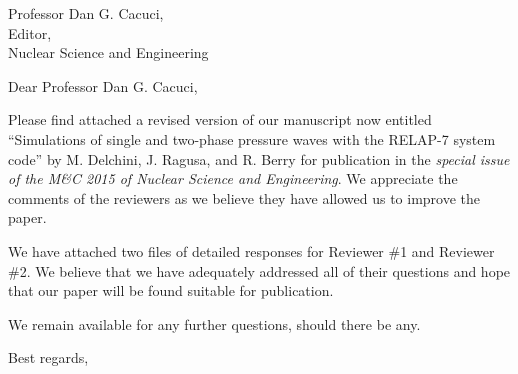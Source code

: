 \begin{letter}{Professor Dan G. Cacuci,\\
    Editor,\\
    Nuclear Science and Engineering}
\date{\today}

\opening{Dear Professor Dan G. Cacuci,}
         \vspace{0.25cm}

Please find attached  a revised version of our manuscript now entitled
``Simulations of single and two-phase pressure waves with the RELAP-7 system code''
by M. Delchini, J. Ragusa, and R. Berry for
publication in the {\em special issue of the M\&C 2015 of Nuclear Science and Engineering}. We appreciate the comments of the reviewers as we
believe they have allowed us to improve the paper.

We have attached two files of detailed responses for Reviewer \#1 and Reviewer \#2. We believe that we have adequately addressed all of their questions and hope that our paper will be found suitable for publication.

\bigskip

We remain available for any further questions, should there be any.
%
%
%

\vspace{0.25cm}



\closing{Best regards, }

\end{letter}


